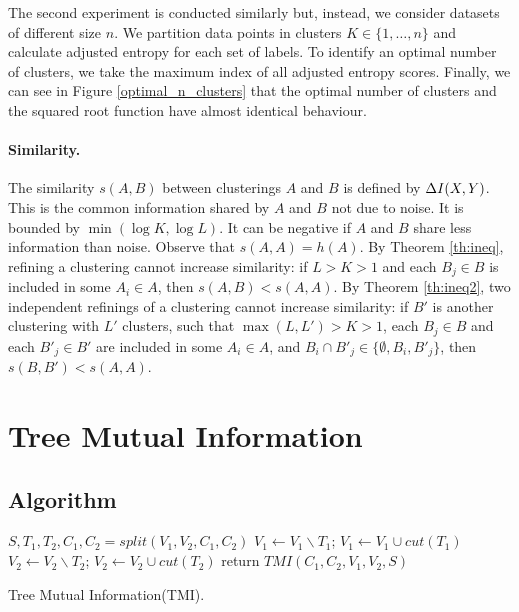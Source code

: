 The second experiment is conducted similarly but, instead, we consider datasets of different size $n$. We partition data points in clusters $K \in \{1,\ldots, n\}$ and calculate adjusted entropy for each set of labels. To identify an optimal number of clusters, we take the maximum index of all adjusted entropy scores. Finally, we can see in Figure \ref{optimal_n_clusters} that the optimal number of clusters and the squared root function have almost identical behaviour.


\paragraph{Similarity.} The similarity $s(A,B)$ between clusterings $A$ and $B$ is defined by $\Delta I(X,Y)$. This is the common information shared by $A$ and $B$ not due to noise. It is bounded by $\min(\log K, \log L)$. It can be negative if $A$ and $B$ share less information than noise. Observe that $s(A,A) = h(A)$. By Theorem \ref{th:ineq}, refining a clustering cannot increase  similarity: if $L > K > 1$ and each $B_j\in B$ is included in some $A_i\in A$, then  $s(A,B) < s(A,A)$. By Theorem \ref{th:ineq2}, two independent refinings of a clustering cannot increase  similarity: if $B'$ is another clustering with $L'$ clusters, such that $\max(L,L') > K > 1$, each $B_j\in B$ and each $B'_j\in B'$ are included in some $A_i\in A$, and $B_i \cap B'_{j} \in \{\emptyset, B_i, B'_j\}$, then  $s(B,B') < s(A,A)$. 


\section{Tree Mutual Information}
\label{algirithm}

\subsection{Algorithm}

\begin{algorithm}[h]
	\SetAlgoLined
	$S, T_1, T_2, C_1, C_2 = split(V_1, V_2, C_1, C_2)$\;
	$V_1 \leftarrow V_1  \backslash T_1$;  $V_1 \leftarrow V_1 \cup cut(T_1)$\;
	$V_2 \leftarrow V_2  \backslash T_2$;  $V_2 \leftarrow V_2 \cup cut(T_2)$\;
	return $TMI(C_1, C_2, V_1, V_2, S)$ 
	\caption{Tree Mutual Information(TMI).}
\end{algorithm}


